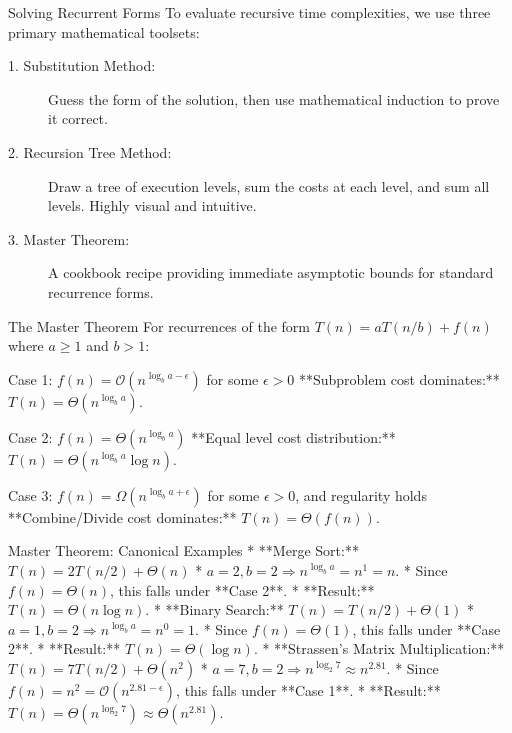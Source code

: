 \documentclass[aspectratio=169,xcolor=dvipsnames]{beamer}
\begin{document}
\begin{frame}{Solving Recurrent Forms}
  To evaluate recursive time complexities, we use three primary mathematical toolsets:
  \begin{description}
    \item[1. Substitution Method:] Guess the form of the solution, then use mathematical induction to prove it correct.
    \item[2. Recursion Tree Method:] Draw a tree of execution levels, sum the costs at each level, and sum all levels. Highly visual and intuitive.
    \item[3. Master Theorem:] A cookbook recipe providing immediate asymptotic bounds for standard recurrence forms.
  \end{description}
\end{frame}

\begin{frame}{The Master Theorem}
  For recurrences of the form $T(n) = aT(n/b) + f(n)$ where $a \ge 1$ and $b > 1$:
  \begin{block}{Case 1: $f(n) = \mathcal{O}(n^{\log_b a - \epsilon})$ for some $\epsilon > 0$}
    **Subproblem cost dominates:** $T(n) = \Theta(n^{\log_b a})$.
  \end{block}
  \begin{block}{Case 2: $f(n) = \Theta(n^{\log_b a})$}
    **Equal level cost distribution:** $T(n) = \Theta(n^{\log_b a} \log n)$.
  \end{block}
  \begin{block}{Case 3: $f(n) = \Omega(n^{\log_b a + \epsilon})$ for some $\epsilon > 0$, and regularity holds}
    **Combine/Divide cost dominates:** $T(n) = \Theta(f(n))$.
  \end{block}
\end{frame}

\begin{frame}{Master Theorem: Canonical Examples}
  * **Merge Sort:** $T(n) = 2T(n/2) + \Theta(n)$
    * $a = 2, b = 2 \Rightarrow n^{\log_b a} = n^1 = n$.
    * Since $f(n) = \Theta(n)$, this falls under **Case 2**.
    * **Result:** $T(n) = \Theta(n \log n)$.
  * **Binary Search:** $T(n) = T(n/2) + \Theta(1)$
    * $a = 1, b = 2 \Rightarrow n^{\log_b a} = n^0 = 1$.
    * Since $f(n) = \Theta(1)$, this falls under **Case 2**.
    * **Result:** $T(n) = \Theta(\log n)$.
  * **Strassen's Matrix Multiplication:** $T(n) = 7T(n/2) + \Theta(n^2)$
    * $a = 7, b = 2 \Rightarrow n^{\log_2 7} \approx n^{2.81}$.
    * Since $f(n) = n^2 = \mathcal{O}(n^{2.81 - \epsilon})$, this falls under **Case 1**.
    * **Result:** $T(n) = \Theta(n^{\log_2 7}) \approx \Theta(n^{2.81})$.
\end{frame}
\end{document}
